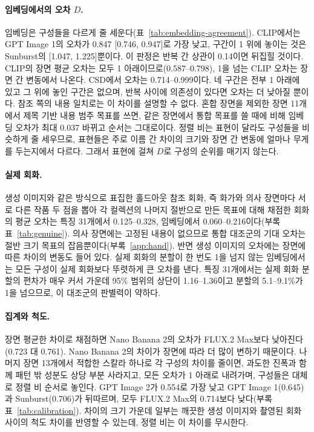 \documentclass[10pt]{article}
\begin{document}


\paragraph{임베딩에서의 오차 $D$.} 임베딩은 구성들을 다르게 줄 세운다(표~\ref{tab:embedding-agreement}).
CLIP에서는 GPT Image 1의 오차가 0.847 [0.746, 0.947]로 가장 낮고, 구간이 1 위에 놓이는 것은 Sunburst의
[1.047, 1.225]뿐이다. 이 판정은 반복 간 상관이 0.14이면 뒤집힐 것이다. CLIP의 장면 평균 오차는 모두 1
아래이므로(0.587--0.798), 1을 넘는 CLIP 오차는 장면 간 변동에서 나온다. CSD에서 오차는 0.714--0.999이다.
네 구간은 전부 1 아래에 있고 그 위에 놓인 구간은 없으며, 반복 사이에 의존성이 있다면 오차는 더 낮아질
뿐이다. 참조 쪽의 내용 일치로는 이 차이를 설명할 수 없다. 혼합 장면을 제외한 장면 11개에서 제목 기반
내용 범주 목표를 쓰면, 같은 장면에서 통합 목표를 쓸 때에 비해 임베딩 오차가 최대 0.037 바뀌고 순서는
그대로이다. 정렬 비는 표현이 달라도 구성들을 비슷하게 줄 세우므로, 표현들은 주로 이름 간 차이의 크기와
장면 간 변동에 얼마나 무게를 두는지에서 다르다. 그래서 표현에 걸쳐 $D$로 구성의 순위를 매기지 않는다.

\paragraph{실제 회화.} 생성 이미지와 같은 방식으로 표집한 홀드아웃 참조 회화, 즉 화가와 의사 장면마다
서로 다른 작품 두 점을 뽑아 각 컬렉션의 나머지 절반으로 만든 목표에 대해 채점한 회화의 평균 오차는 특징
31개에서 0.125--0.328, 임베딩에서 0.060--0.216이다(부록 표~\ref{tab:genuine}). 의사 장면에는 고정된
내용이 없으므로 통합 대조군의 기대 오차는 절반 크기 목표의 잡음뿐이다(부록~\ref{app:hand}). 반면 생성
이미지의 오차에는 장면에 따른 차이의 변동도 들어 있다. 실제 회화의 분할이 한 번도 1을 넘지 않는
임베딩에서는 모든 구성이 실제 회화보다 뚜렷하게 큰 오차를 낸다. 특징 31개에서는 실제 회화 분할의
편차가 매우 커서 가운데 95\% 범위의 상단이 1.16--1.36이고 분할의 5.1--9.1\%가 1을 넘으므로, 이
대조군의 판별력이 약하다.

\paragraph{집계와 척도.} 장면 평균한 차이로 채점하면 Nano Banana 2의 오차가 FLUX.2 Max보다 낮아진다
(0.723 대 0.761). Nano Banana 2의 차이가 장면에 따라 더 많이 변하기 때문이다. 나머지 장면 13개에서
적합한 스칼라 하나로 각 구성의 차이를 줄이면, 과도한 진폭과 함께 패턴 밖 성분도 상당 부분 사라지고,
모든 오차가 1 아래로 내려가며, 구성들은 대체로 정렬 비 순서로 놓인다. GPT Image 2가 0.554로 가장 낮고
GPT Image 1(0.645)과 Sunburst(0.706)가 뒤따르며, 모두 FLUX.2 Max의 0.714보다 낮다(부록
표~\ref{tab:calibration}). 차이의 크기 가운데 일부는 깨끗한 생성 이미지와 촬영된 회화 사이의 척도
차이를 반영할 수 있는데, 정렬 비는 이 차이를 무시한다.
\end{document}
